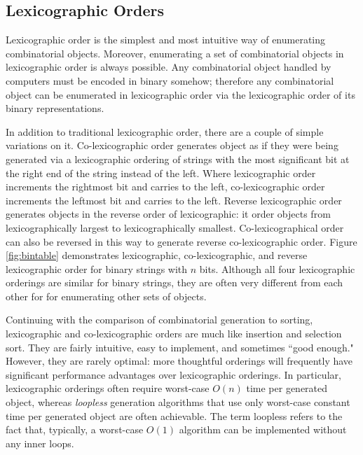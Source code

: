 \subsection{Lexicographic Orders}
Lexicographic order is the simplest and most intuitive way of enumerating combinatorial objects.  Moreover, enumerating a set of combinatorial objects in lexicographic order is always possible. Any combinatorial object handled by computers must be encoded in binary somehow; therefore any combinatorial object can be enumerated in lexicographic order via the lexicographic order of its binary representations. 


In addition to traditional lexicographic order, there are a couple of simple variations on it. Co-lexicographic order generates object as if they were being generated via a lexicographic ordering of strings with the most significant bit at the right end of the string instead of the left.  Where lexicographic order increments the rightmost bit and carries to the left, co-lexicographic order increments the leftmost bit and carries to the left. Reverse lexicographic order generates objects in the reverse order of lexicographic: it order objects from lexicographically largest to lexicographically smallest. Co-lexicographical order can also be reversed in this way to generate reverse co-lexicographic order. Figure \ref{fig:bintable} demonstrates lexicographic, co-lexicographic, and reverse lexicographic order for binary strings with $n$ bits.  Although all four lexicographic orderings are similar for binary strings, they are often very different from each other for for enumerating other sets of objects.

Continuing with the comparison of combinatorial generation to sorting, lexicographic and co-lexicographic orders are much like insertion and selection sort.  They are fairly intuitive, easy to implement, and sometimes ``good enough."  However, they are rarely optimal: more thoughtful orderings will frequently have significant performance advantages over lexicographic orderings. In particular, lexicographic orderings often require worst-case $O(n)$ time per generated object, whereas \emph{loopless} generation algorithms that use only worst-case constant time per generated object are often achievable. The term loopless refers to the fact that, typically, a worst-case $O(1)$ algorithm can be implemented without any inner loops.



